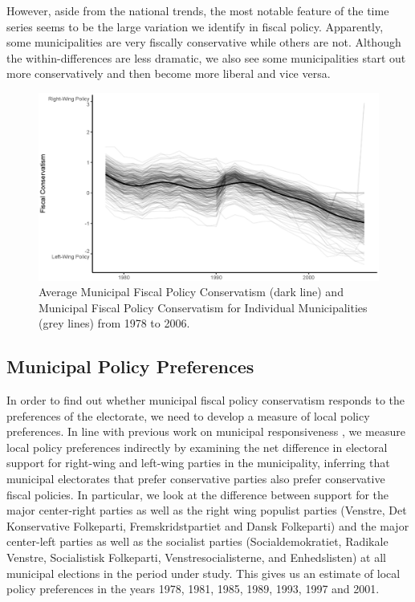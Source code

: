 \documentclass[a4paper,12pt]{article}
\begin{document}
However, aside from the national trends, the most notable feature of the time series seems to be the large variation we identify in fiscal policy. Apparently, some municipalities are very fiscally conservative while others are not. Although the within-differences are less dramatic, we also see some municipalities start out more conservatively and then become more liberal and vice versa.

\begin{figure}[htbp]
	\centering 
	
	\includegraphics[width=1\textwidth]{fiscal_TimeSeries.eps}
	\caption{Average Municipal Fiscal Policy Conservatism (dark line) and Municipal Fiscal Policy Conservatism for Individual Municipalities (grey lines) from 1978 to 2006.}
	\label{fig:timeline}
	

	
\end{figure}


\subsection*{Municipal Policy Preferences}

In order to find out whether municipal fiscal policy conservatism responds to the preferences of the electorate, we need to develop a measure of local policy preferences. In line with previous work on municipal responsiveness \cite[e.g.,][]{sances2017ideology,einstein2016pushing}, we measure local policy preferences indirectly by examining the net difference in electoral support for right-wing and left-wing parties in the municipality, inferring that municipal electorates that prefer conservative parties also prefer conservative fiscal policies. In particular, we look at the difference between support for the major center-right parties as well as the right wing populist parties (Venstre, Det Konservative Folkeparti, Fremskridstpartiet and Dansk Folkeparti) and the major center-left parties as well as the socialist parties (Socialdemokratiet, Radikale Venstre, Socialistisk Folkeparti, Venstresocialisterne, and Enhedslisten) at all municipal elections in the period under study. This gives us an estimate of local policy preferences in the years 1978, 1981, 1985, 1989, 1993, 1997 and 2001.
\end{document}
